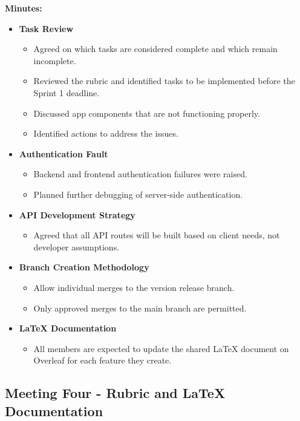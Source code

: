 \textbf{Minutes:}
\begin{itemize}
    \item \textbf{Task Review}
    \begin{itemize}
        \item Agreed on which tasks are considered complete and which remain incomplete.
        \item Reviewed the rubric and identified tasks to be implemented before the Sprint 1 deadline.
        \item Discussed app components that are not functioning properly.
        \item Identified actions to address the issues.
    \end{itemize}

    \item \textbf{Authentication Fault}
    \begin{itemize}
        \item Backend and frontend authentication failures were raised.
        \item Planned further debugging of server-side authentication.
    \end{itemize}

    \item \textbf{API Development Strategy}
    \begin{itemize}
        \item Agreed that all API routes will be built based on client needs, not developer assumptions.
    \end{itemize}

    \item \textbf{Branch Creation Methodology}
    \begin{itemize}
        \item Allow individual merges to the version release branch.
        \item Only approved merges to the main branch are permitted.
    \end{itemize}

    \item \textbf{LaTeX Documentation}
    \begin{itemize}
        \item All members are expected to update the shared LaTeX document on Overleaf for each feature they create.
    \end{itemize}
\end{itemize}


\subsection{Meeting Four - Rubric and LaTeX Documentation}

